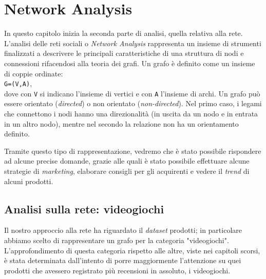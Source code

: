 \chapter{Network Analysis}
\label{cap:NetworkAnalysis}
	In questo capitolo inizia la seconda parte di analisi, quella relativa alla rete. L’analisi delle reti sociali o \textit{Network Analysis} rappresenta un insieme di strumenti finalizzati a descrivere le principali caratteristiche di una struttura di nodi e connessioni rifacendosi alla teoria dei grafi. Un grafo è definito come un insieme di coppie ordinate: \\
	\verb|G=(V,A)|, \\
	dove con \verb|V| si indicano l'insieme di vertici e con \verb|A| l'insieme di archi. Un grafo può essere orientato (\textit{directed}) o non orientato (\textit{non-directed}). Nel primo caso, i legami che connettono i nodi hanno una direzionalità (in uscita da un nodo e in entrata in un altro nodo), mentre nel secondo la relazione non ha un orientamento definito. 
	
	Tramite questo tipo di rappresentazione, vedremo che è stato possibile rispondere ad alcune precise domande, grazie alle quali è stato possibile effettuare alcune strategie di \textit{marketing}, elaborare consigli per gli acquirenti e vedere il \textit{trend} di alcuni prodotti.   
	
	
	\section{Analisi sulla rete: videogiochi}
		Il nostro approccio alla rete ha riguardato il \textit{dataset} prodotti; in particolare abbiamo scelto di rappresentare un grafo per la categoria "videogiochi". L'approfondimento di questa categoria rispetto alle altre, viste nei capitoli scorsi, è stata determinata dall'intento di porre maggiormente l'attenzione su quei prodotti che avessero registrato più recensioni in assoluto, i videogiochi. 
		
